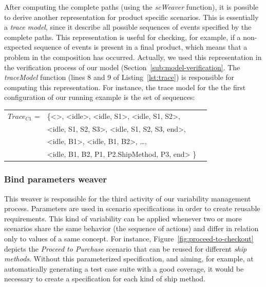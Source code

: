 \documentclass{acm_proc_article-sp}
\begin{document}
After computing the complete paths (using the \emph{scWeaver} function), it is possible to derive another representation for product specific scenarios. This is essentially a \emph{trace model}, since it describe all possible sequences of events specified by the complete paths. This representation is useful for checking, for example, if a non-expected sequence of events is present in a final product, which means that a problem in the composition has occurred. Actually, we used this representation in the verification process of our model (Section~\ref{sub:model-verification}. The \emph{traceModel} function (lines 8 and 9 of Listing~\ref{lst:trace}) is responsible for computing this representation. For instance, the trace model for the the first configuration of our running example is the set of sequences:

\begin{small}
\begin{tabular}{rlc}
$Trace_{C1}$ = & \{<>, <idle>, <idle, S1>, <idle, S1, S2>, \\
                    & <idle, S1, S2, S3>,  <idle, S1, S2, S3, end>, \\
                    & <idle, B1>, <idle, B1, B2>, \ldots, \\
                    & <idle, B1, B2, P1, P2.ShipMethod, P3, end> \}
\end{tabular}
\end{small}



\subsubsection{Bind parameters weaver}\label{sub:bind-weaver}

This weaver is responsible for the third activity of our variability
management process. Parameters are used in scenario specifications
in order to create reusable requirements. This kind of variability can be applied
whenever two or more scenarios share the same behavior (the sequence
of actions) and differ in relation only to values of a same concept.
For instance, Figure~\ref{fig:proceed-to-checkout} depicts the \emph{Proceed to Purchase}
scenario that can be reused for different \emph{ship methods}. Without this
parameterized specification, and aiming, for example, at automatically generating a test case suite
with a good coverage, it would be necessary to create a specification for each kind of ship method.
\end{document}
